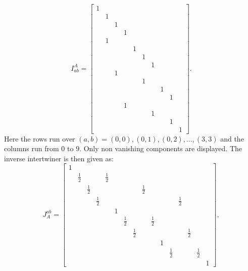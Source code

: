 \documentclass[a4paper,12pt, DIV=14, BCOR=5mm, twoside, headsepline]{scrbook}
\begin{document}
\begin{equation}\label{interIMet}
I^A_{ab} = \begin{bmatrix}
                1 & & & & & & & & & \\
                & 1 & & & & & & & & \\
                & & 1 & & & & & & & \\
                & & & 1 & & & & & & \\
                & 1 & & & & & & & & \\
                & & & & 1 & & & & & \\
                & & & & & 1 & & & & \\
                & & & & & & 1 & & & \\
                & & 1 & & & & & & & \\
                & & & & & 1 & & & & \\
                & & & & & & & 1 & & \\
                & & & & & & & & 1 & \\
                & & & 1 & & & & & & \\
                & & & & & & 1 & & & \\
                & & & & & & & & 1 & \\
                & & & & & & & & & 1 
            \end{bmatrix}.
\end{equation}
Here the rows run over $(a,b)={(0,0),(0,1),(0,2),...,(3,3)}$ and the columns run from $0$ to $9$. Only non vanishing components are displayed. The inverse intertwiner is then given as: 
\begin{equation}\label{interJMet}
J^{ab}_{A} = \begin{bmatrix} 
                1 & & & & & & & & & & & & & & & \\
                & \frac{1}{2} & & & \frac{1}{2} & & & & & & & & & & &  \\
                & & \frac{1}{2} & & & & & & \frac{1}{2} & & & & & & &  \\
                & & & \frac{1}{2} & & & & & & & & & \frac{1}{2} & & &  \\
                & & & & & 1 & & & & & & & & & &  \\
                & & & & & & \frac{1}{2} & & & \frac{1}{2} & & & & & &  \\
                & & & & & & & \frac{1}{2} & & & & & & \frac{1}{2} & &  \\
                & & & & & & & & & & 1 & & & & &  \\
                & & & & & & & & & & & \frac{1}{2} & & & \frac{1}{2} &  \\
                & & & & & & & & & & & & & & & 1  
            \end{bmatrix},
\end{equation}
\end{document}
